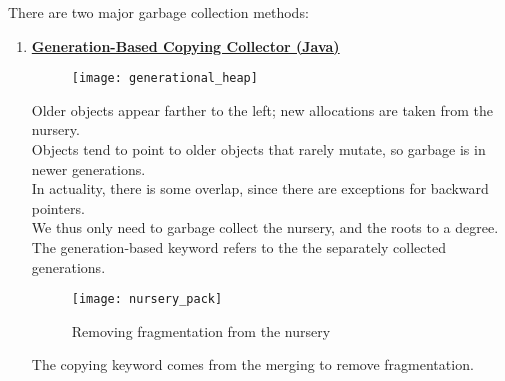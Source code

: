 \documentclass[../../lecture_notes.tex]{subfiles}
\begin{document}
\noindent There are two major garbage collection methods:
	\begin{enumerate} [itemsep=0mm]
	\item \textbf{\underline{Generation-Based Copying Collector (Java)}}

		\begin{figure}[H]
			\centering
			\texttt{[image: generational\_heap]}
			\label{fig:test}
		\end{figure}

		Older objects appear farther to the left; new allocations are taken from the nursery.\\
		Objects tend to point to older objects that rarely mutate, so garbage is in newer generations.\\
		In actuality, there is some overlap, since there are exceptions for backward pointers.\\
		We thus only need to garbage collect the nursery, and the roots to a degree.\\
		The generation-based keyword refers to the the separately collected generations.\\

		\begin{figure}[H]
			\centering
			\texttt{[image: nursery\_pack]}
			\caption{Removing fragmentation from the nursery}
			\label{fig:test}
		\end{figure}

		The copying keyword comes from the merging to remove fragmentation.\\
		

\end{enumerate}
\end{document}
